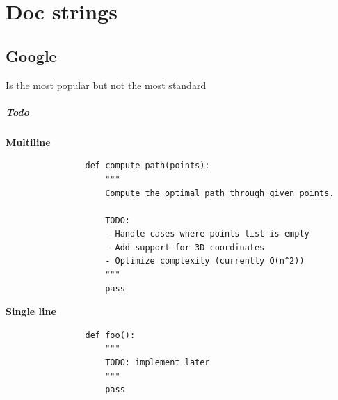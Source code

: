 \chapter{Doc strings}
\section{Google}
    Is the most popular but not the most standard
    
    \paragraph{Todo}
        \textbf{Multiline}
        \begin{verbatim}
                def compute_path(points):
                    """
                    Compute the optimal path through given points.

                    TODO:
                    - Handle cases where points list is empty
                    - Add support for 3D coordinates
                    - Optimize complexity (currently O(n^2))
                    """
                    pass
        \end{verbatim}
        \textbf{Single line}
        \begin{verbatim}
                def foo():
                    """
                    TODO: implement later
                    """
                    pass
        \end{verbatim}